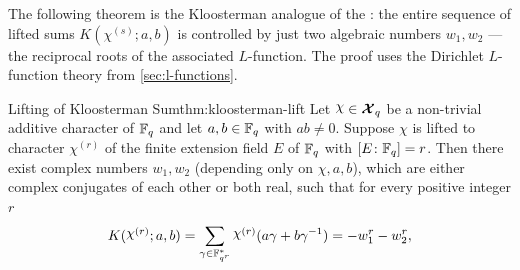 The following theorem is the Kloosterman analogue of the \DHthm: the entire sequence of lifted sums $K(\chi^{(s)};a,b)$ is controlled by just two algebraic numbers $w_1,w_2$ --- the reciprocal roots of the associated $L$-function. The proof uses the Dirichlet $L$-function theory from \autoref{sec:l-functions}.
\begin{Theorem}{Lifting of Kloosterman Sum}{thm:kloosterman-lift}
  Let $\chi\in\Xq$ be a non-trivial additive character of $\mathbb{F}_q$ and let $a,b\in\mathbb{F}_q$ with $ab\neq 0$. Suppose $\chi$ is lifted to character $\chi^{(r)}$ of the finite extension field $E$ of $\mathbb{F}_q$ with $[E\colon \mathbb{F}_q]=r$. Then there exist complex numbers $w_1,w_2$ (depending only on $\chi,a,b$), which are either complex conjugates of each other or both real, such that for every positive integer $r$
  $$K(\chi^{(r)};a,b)=\sum_{\gm\in\bbF_{q^r}^*}\chi^{(r)}(a\gm+b\gm^{-1})=-w_1^r-w_2^r,$$
\end{Theorem}
